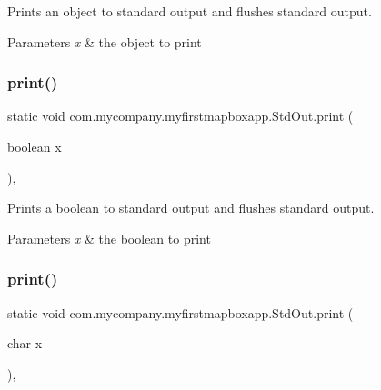 Prints an object to standard output and flushes standard output.


\begin{DoxyParams}{Parameters}
{\em x} & the object to print \\
\hline
\end{DoxyParams}
\mbox{\label{classcom_1_1mycompany_1_1myfirstmapboxapp_1_1_std_out_ab09e01125c6d2a478e20f558372a6325}} 
\subsubsection{\texorpdfstring{print()}{print()}\hspace{0.1cm}{\footnotesize\ttfamily [3/10]}}
{\footnotesize\ttfamily static void com.\+mycompany.\+myfirstmapboxapp.\+Std\+Out.\+print (\begin{DoxyParamCaption}\item[{boolean}]{x }\end{DoxyParamCaption})\hspace{0.3cm}{\ttfamily [inline]}, {\ttfamily [static]}}

Prints a boolean to standard output and flushes standard output.


\begin{DoxyParams}{Parameters}
{\em x} & the boolean to print \\
\hline
\end{DoxyParams}
\mbox{\label{classcom_1_1mycompany_1_1myfirstmapboxapp_1_1_std_out_ae7a0beff9d42a5d57664312bdd3870bf}} 
\subsubsection{\texorpdfstring{print()}{print()}\hspace{0.1cm}{\footnotesize\ttfamily [4/10]}}
{\footnotesize\ttfamily static void com.\+mycompany.\+myfirstmapboxapp.\+Std\+Out.\+print (\begin{DoxyParamCaption}\item[{char}]{x }\end{DoxyParamCaption})\hspace{0.3cm}{\ttfamily [inline]}, {\ttfamily [static]}}

